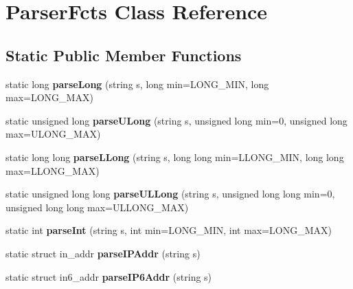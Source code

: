 \hypertarget{classParserFcts}{}\section{Parser\+Fcts Class Reference}
\label{classParserFcts}
\subsection*{Static Public Member Functions}
\begin{DoxyCompactItemize}
\item 
\mbox{\label{classParserFcts_a2eea6aa325dc6d2ebe9b509183ef1fe4}} 
static long {\bfseries parse\+Long} (string s, long min=L\+O\+N\+G\+\_\+\+M\+IN, long max=L\+O\+N\+G\+\_\+\+M\+AX)
\item 
\mbox{\label{classParserFcts_a32787caa043d964e5368f80a03a0632a}} 
static unsigned long {\bfseries parse\+U\+Long} (string s, unsigned long min=0, unsigned long max=U\+L\+O\+N\+G\+\_\+\+M\+AX)
\item 
\mbox{\label{classParserFcts_a2d35300e2b8ebdb39bb26402af786a87}} 
static long long {\bfseries parse\+L\+Long} (string s, long long min=L\+L\+O\+N\+G\+\_\+\+M\+IN, long long max=L\+L\+O\+N\+G\+\_\+\+M\+AX)
\item 
\mbox{\label{classParserFcts_a18324a2102c2f085af647e698963dd7a}} 
static unsigned long long {\bfseries parse\+U\+L\+Long} (string s, unsigned long long min=0, unsigned long long max=U\+L\+L\+O\+N\+G\+\_\+\+M\+AX)
\item 
\mbox{\label{classParserFcts_a819b71471344e34d2e3ed215661fb161}} 
static int {\bfseries parse\+Int} (string s, int min=L\+O\+N\+G\+\_\+\+M\+IN, int max=L\+O\+N\+G\+\_\+\+M\+AX)
\item 
\mbox{\label{classParserFcts_a1a8abe2e4ec2e7a887ae5cb42c6b327c}} 
static struct in\+\_\+addr {\bfseries parse\+I\+P\+Addr} (string s)
\item 
\mbox{\label{classParserFcts_ab6f08cda85266ac3599be8c0c9993615}} 
static struct in6\+\_\+addr {\bfseries parse\+I\+P6\+Addr} (string s)
\item 

\end{DoxyCompactItemize}
